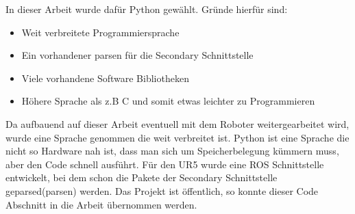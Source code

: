 In dieser Arbeit wurde dafür Python gewählt. Gründe hierfür sind:

\begin{itemize}
\item Weit verbreitete Programmiersprache
\item Ein vorhandener \acl{parsen} für die Secondary Schnittstelle
\item Viele vorhandene \acs{Software Bibliotheken}
\item Höhere Sprache als z.B C und somit etwas leichter zu Programmieren
\end{itemize}

Da aufbauend auf dieser Arbeit eventuell mit dem Roboter weitergearbeitet wird, wurde eine Sprache genommen die weit verbreitet ist. Python ist eine Sprache die nicht so Hardware nah ist, dass man sich um Speicherbelegung kümmern muss, aber den Code schnell ausführt.
Für den UR5 wurde eine \ac{ROS} Schnittstelle entwickelt, bei dem schon die Pakete der Secondary Schnittstelle geparsed(\acl{parsen}) werden. Das Projekt ist öffentlich, so konnte dieser Code Abschnitt in die Arbeit übernommen werden.